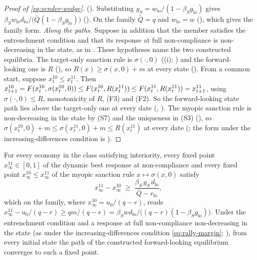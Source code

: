 \begin{proof}[Proof of \eqref{eq:sender-wedge}]
(). Substituting
$g_S=w_{\mathrm{lo}}/(1-\beta_Sg_{\mathrm{lo}})$ gives
$\beta_Sw_{\mathrm{lo}}d_{\mathrm{lo}}/\bigl(\bar Q(1-\beta_Sg_{\mathrm{lo}})\bigr)$
(). On the family $\bar Q=q$ and $w_{\mathrm{lo}}=w$
(), which gives the family form.
\emph{Along the paths.} Suppose in addition that the member satisfies the
entrenchment condition and that its response at full non-compliance is non-decreasing in
the state, as in . These hypotheses name the two
constructed equilibria. The target-only sanction rule is $\sigma(\cdot,0)$
((i); ) and the
forward-looking one is $R$
(), so
$R(x)\ge\sigma(x,0)+m$ at every state
(). From a
common start, suppose $x^{10}_t\le x^{11}_t$. Then
$x^{10}_{t+1}=F(x^{10}_t,\sigma(x^{10}_t,0))\le F(x^{10}_t,R(x^{11}_t))
\le F(x^{11}_t,R(x^{11}_t))=x^{11}_{t+1}$, using $\sigma(\cdot,0)\le R$,
monotonicity of $R$, (F3) and (F2). So the forward-looking state path lies above the target-only one at
every date (,
). The myopic sanction rule is
non-decreasing in the state by (S7) and the uniqueness in (S3)
(), so
$\sigma(x^{10}_t,0)+m\le\sigma(x^{11}_t,0)+m\le R(x^{11}_t)$ at every date
(;
the form under the increasing-differences condition is
).
\end{proof}

\begin{proposition}
\label{prop:steady-gap}
For every economy in the class satisfying interiority, every fixed point
$x^{11}_\infty\in[0,1]$ of the dynamic best response at non-compliance and every fixed point $x^{10}_\infty\le x^{11}_\infty$ of the
myopic sanction rule $x\mapsto\sigma(x,0)$ satisfy
\[
x^{11}_\infty-x^{10}_\infty\;\ge\;\frac{\beta_S\,g_S\,d_{\mathrm{lo}}}{\bar Q-r_{\mathrm{lo}}},
\]
which on the family, where $x^{10}_\infty=u_0/(q-r)$, reads
$x^{11}_\infty-u_0/(q-r)\ge qm/(q-r)=\beta_S w d_{\mathrm{lo}}/\bigl((q-r)(1-\beta_S g_{\mathrm{lo}})\bigr)$.
Under the entrenchment condition and a response at full non-compliance non-decreasing in
the state (as under the increasing-differences condition \eqref{eq:rally-margin};
), from every initial state the path of the
constructed forward-looking equilibrium converges to such a fixed point.
\end{proposition}

